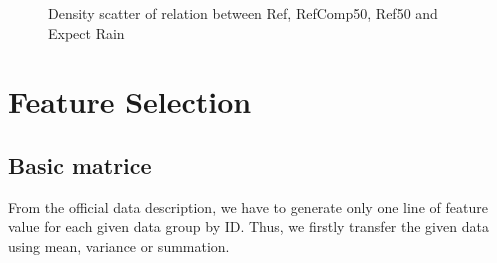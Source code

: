 \documentclass{article} %
\begin{document}
\begin{figure}[h]
\caption{Density scatter of relation between Ref, RefComp50, Ref50 and Expect Rain}
\end{figure}




\section{Feature Selection}
\subsection{Basic matrice}
From the official data description, we have to generate only one line of feature value for each given data group by ID. Thus, we firstly transfer the given data using mean, variance or summation.\\
\end{document}
